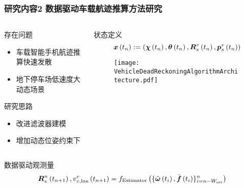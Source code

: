 \begin{frame}
	\frametitle{研究内容2 数据驱动车载航迹推算方法研究} 
	\vspace{-1cm}
	\begin{columns}[t]
		\begin{column}{0.5\textwidth}
		    \begin{block}{存在问题}
		    {
		    	\small
		        \begin{itemize}
					\item 车载智能手机航迹推算快速发散
					\item 地下停车场低速度大动态场景
		        \end{itemize}
    		 } 
			\end{block}
			\begin{block}{研究思路}
			 {
 		    	\small
				\begin{itemize}
					\item 改进滤波器建模
					\item 增加动态位姿约束下
				\end{itemize}
			}
			\end{block}
		\end{column}   
		\begin{column}{0.5\textwidth}
		    \begin{block}{状态定义}
      		{
  		    	\small
				\begin{equation*}
				   	\vb*{x}\left(t_n\right) := \left( \vb*{\chi}\left(t_n\right), \vb*{\theta}\left(t_n\right), \vb*{R}_s^v\left(t_n\right), \vb*{p}_s^v\left(t_n\right)\right) 
				\end{equation*}
			}
			\end{block} 
			\begin{figure}
				\centering
				\texttt{[image: VehicleDeadReckoningAlgorithmArchitecture.pdf]}
			\end{figure}
		\end{column}
	\end{columns} 
	\begin{block}{数据驱动观测量}
		\begin{equation*}
			\vb*{R}_{s}^{n}\left(t_{n+1}\right), v^{v}_{v, \mathrm{lon}}\left(t_{n+1}\right)
			=
			f_{\mathrm{Estimator}}\left(\{\tilde{\vb*{\omega}}\left(t_i\right), \tilde{\vb*{f}}\left(t_i\right)\}_{i = n-W_{\mathrm{est}}}^{n}\right)
		\end{equation*}
	\end{block}
\end{frame}

